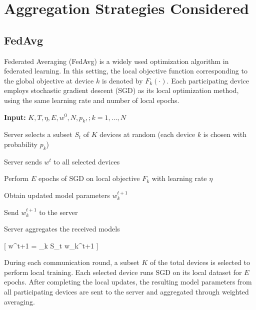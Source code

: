 \documentclass[12pt]{book}
\begin{document}
\vspace{7cm}

\chapter{Aggregation Strategies Considered}

\section{FedAvg}

Federated Averaging (FedAvg) is a widely used optimization algorithm in federated learning. In this setting, the local objective function corresponding to the global objective at device $k$ is denoted by $F_k(\cdot)$. Each participating device employs stochastic gradient descent (SGD) as its local optimization method, using the same learning rate and number of local epochs.

\begin{algorithm}[t]
\caption{Federated Averaging (FedAvg)}
\label{alg:fedavg}
\begin{algorithmic}[1]

\STATE \textbf{Input:} $K, T, \eta, E, w^0, N, p_k,; k = 1,\dots,N$


\STATE Server selects a subset $S_t$ of $K$ devices at random (each device $k$ is chosen with probability $p_k$)

\STATE Server sends $w^t$ to all selected devices


\STATE Perform $E$ epochs of SGD on local objective $F_k$ with learning rate $\eta$

\STATE Obtain updated model parameters $w_k^{t+1}$

\STATE Send $w_k^{t+1}$ to the server

\ENDFOR

\STATE Server aggregates the received models

[
w^{t+1} = \sum_{k \in S_t} w_k^{t+1}
]

\ENDFOR

\end{algorithmic}
\end{algorithm}

During each communication round, a subset $K$ of the total devices is selected to perform local training. Each selected device runs SGD on its local dataset for $E$ epochs. After completing the local updates, the resulting model parameters from all participating devices are sent to the server and aggregated through weighted averaging.
\end{document}
